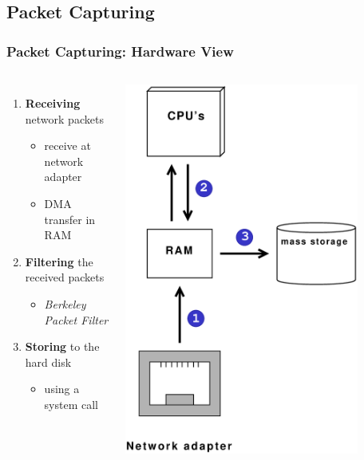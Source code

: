\subsection*{Packet Capturing}
\begin{frame}
\frametitle{Packet Capturing: Hardware View}
\begin{columns}
\vspace{-15em}
\begin{enumerate}
	\item \textbf{Receiving} network packets
		\begin{itemize}
			\item receive at network adapter
			\item DMA transfer in RAM \newline
		\end{itemize}
	\item \textbf{Filtering} the received packets 
		\begin{itemize}
			\item \emph{Berkeley Packet Filter}\newline
		\end{itemize}
	\item \textbf{Storing} to the hard disk
		\begin{itemize}
			\item using a system call
		\end{itemize}
\end{enumerate}
\includegraphics [width=0.82\textwidth, keepaspectratio]{pics/HardwareView}
\end{columns}
\end{frame}

